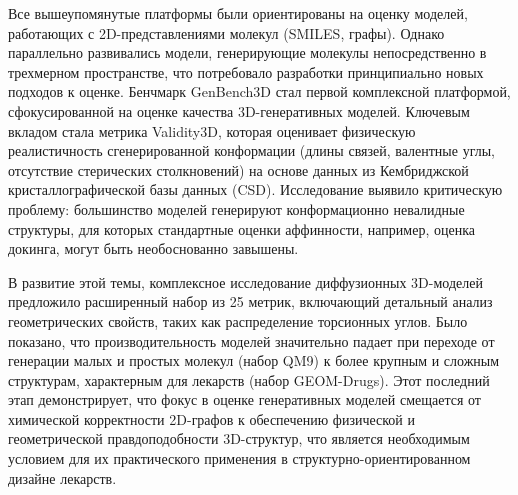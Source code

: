 
Все вышеупомянутые платформы были ориентированы на оценку моделей, работающих с 2D-представлениями молекул (SMILES, графы). Однако параллельно развивались модели, генерирующие молекулы непосредственно в трехмерном пространстве, что потребовало разработки принципиально новых подходов к оценке. Бенчмарк GenBench3D \cite{baillif2024benchmarking} стал первой комплексной платформой, сфокусированной на оценке качества 3D-генеративных моделей. Ключевым вкладом стала метрика Validity3D, которая оценивает физическую реалистичность сгенерированной конформации (длины связей, валентные углы, отсутствие стерических столкновений) на основе данных из Кембриджской кристаллографической базы данных (CSD). Исследование выявило критическую проблему: большинство моделей генерируют конформационно невалидные структуры, для которых стандартные оценки аффинности, например, оценка докинга, могут быть необоснованно завышены. 

В развитие этой темы, комплексное исследование диффузионных 3D-моделей \cite{qin2025comprehensive} предложило расширенный набор из 25 метрик, включающий детальный анализ геометрических свойств, таких как распределение торсионных углов. Было показано, что производительность моделей значительно падает при переходе от генерации малых и простых молекул (набор QM9) к более крупным и сложным структурам, характерным для лекарств (набор GEOM-Drugs). Этот последний этап демонстрирует, что фокус в оценке генеративных моделей смещается от химической корректности 2D-графов к обеспечению физической и геометрической правдоподобности 3D-структур, что является необходимым условием для их практического применения в структурно-ориентированном дизайне лекарств.